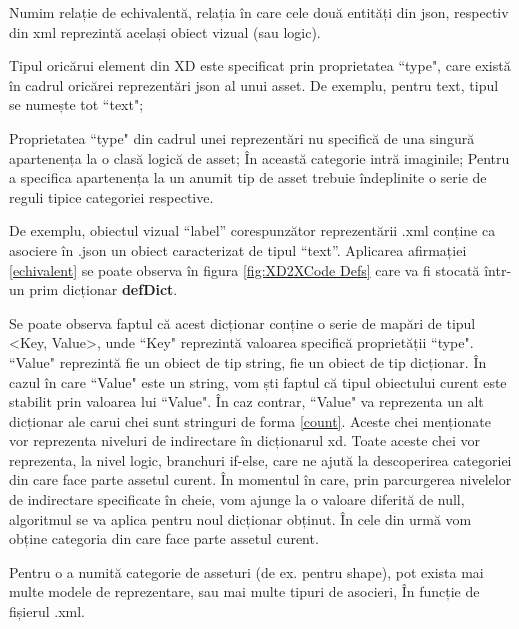 \begin{mydef}\label{echivalent}
Numim relație de echivalentă, relația în care cele două entități din json, respectiv din  xml reprezintă același obiect vizual (sau logic). 
\end{mydef}

\begin{myNote}\label{tip}
Tipul oricărui element din XD este specificat prin proprietatea ``type", care există în cadrul oricărei reprezentări json al unui asset. De exemplu, pentru text, tipul se numește tot ``text";
\end{myNote}

\begin{myNote}\label{echivalent}
Proprietatea ``type" din cadrul unei reprezentări nu specifică de una singură apartenența la o clasă logică de asset; În această categorie intră imaginile; Pentru a specifica apartenența la un anumit tip de asset trebuie îndeplinite o serie de reguli tipice categoriei respective.
\end{myNote}

De exemplu, obiectul vizual “label” corespunzător reprezentării .xml conține ca asociere în .json un obiect caracterizat de tipul “text”. Aplicarea afirmației \ref{echivalent} se poate observa în figura \ref{fig:XD2XCode Defs} care va fi stocată într-un prim dicționar \textbf{defDict}.

Se poate observa faptul că acest dicționar conține o serie de mapări de tipul <Key, Value>, unde ``Key" reprezintă valoarea specifică proprietății ``type". ``Value" reprezintă fie un obiect de tip string, fie un obiect de tip dicționar. În cazul în care ``Value" este un string, vom ști faptul că tipul obiectului curent este stabilit prin valoarea lui ``Value". În caz contrar, ``Value" va reprezenta un alt dicționar ale carui chei sunt stringuri de forma \ref{count}. Aceste chei menționate vor reprezenta niveluri de indirectare în dicționarul xd. Toate aceste chei vor reprezenta, la nivel logic, branchuri if-else, care ne ajută la descoperirea categoriei din care face parte assetul curent. În momentul în care, prin parcurgerea nivelelor de indirectare specificate în cheie, vom ajunge la o valoare diferită de null, algoritmul se va aplica pentru noul dicționar obținut. În cele din urmă vom obține categoria din care face parte assetul curent. 

\begin{myNote}\label{tip similar}

Pentru o a numită categorie de asseturi (de ex. pentru shape), pot exista mai multe modele de reprezentare, sau mai multe tipuri de asocieri, În funcție de fișierul .xml.
\end{myNote}

